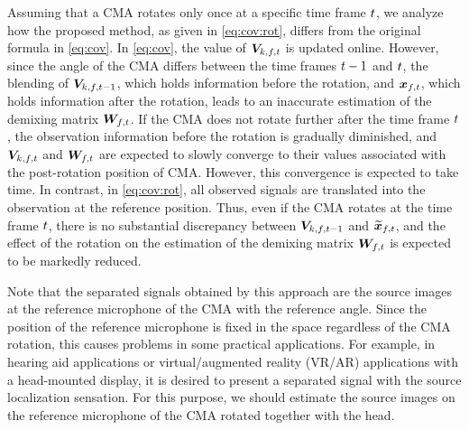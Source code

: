 \documentclass[sip,biber]{now-journal}
\begin{document}
Assuming that a CMA rotates only once at a specific time frame $t$, we analyze how the proposed method, as given in \cref{eq:cov:rot}, differs from the original formula in \cref{eq:cov}.
In \cref{eq:cov}, the value of $\cov _{\src,\ft}$ is updated online.
However, since the angle of the CMA differs between the time frames $t - 1$ and $t$, the blending of $\cov _{\src,\ft[-1]}$, which holds information before the rotation, and $\Obs _{\ft}$, which holds information after the rotation, leads to an inaccurate estimation of the demixing matrix $\Demix _{\ft}$.
If the CMA does not rotate further after the time frame $t$,
the observation information before the rotation is gradually diminished, and
$\cov _{\src,\ft}$ and $\Demix _{\ft}$ are expected to slowly converge to their values associated with the post-rotation position of CMA.
However, this convergence is expected to take time.
In contrast, in \cref{eq:cov:rot}, all observed signals are translated into the observation at the reference position.
Thus, even if the CMA rotates at the time frame $t$, there is no substantial discrepancy between $\cov _{\src,\ft[-1]}$ and $\refpos{\Obs} _{\ft}$, and the effect of the rotation on the estimation of the demixing matrix $\Demix _{\ft}$ is expected to be markedly reduced.

Note that the separated signals obtained by this approach are the source images at the reference microphone of the CMA with the reference angle.
Since the position of the reference microphone is fixed in the space regardless of the CMA rotation, this causes problems in some practical applications.
For example, in hearing aid applications or virtual/augmented reality (VR/AR) applications with a head-mounted display, it is desired to present a separated signal with the source localization sensation.
For this purpose, we should estimate the source images on the reference microphone of the CMA rotated together with the head.
\end{document}
